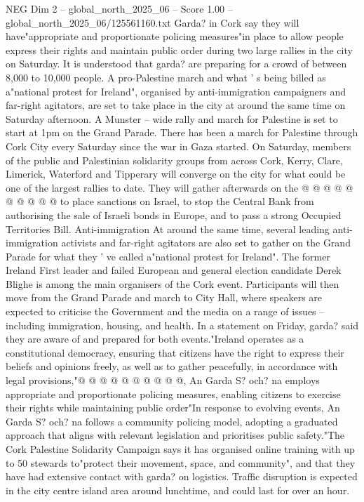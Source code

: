 \begin{textsample}{NEG Dim 2 – global\_north\_2025\_06 – Score 1.00 – global\_north\_2025\_06/125561160.txt}  \label{ex:f2_neg_092}
Garda? in Cork say they will have"appropriate and proportionate policing measures"in place to allow people express their rights and maintain public order during two large rallies in the city on Saturday.
It is understood that garda? are preparing for a crowd of between 8,000 to 10,000 people.
A pro-Palestine march and what ' s being billed as a"national protest for Ireland", organised by anti-immigration campaigners and far-right agitators, are set to take place in the city at around the same time on Saturday afternoon.
A Munster -- wide rally and march for Palestine is set to start at 1pm on the Grand Parade.
There has been a march for Palestine through Cork City every Saturday since the war in Gaza started.
On Saturday, members of the public and Palestinian solidarity groups from across Cork, Kerry, Clare, Limerick, Waterford and Tipperary will converge on the city for what could be one of the largest rallies to date.
They will gather afterwards on the @ @ @ @ @ @ @ @ @ @ to place sanctions on Israel, to stop the Central Bank from authorising the sale of Israeli bonds in Europe, and to pass a strong Occupied Territories Bill.
Anti-immigration At around the same time, several leading anti-immigration activists and far-right agitators are also set to gather on the Grand Parade for what they ' ve called a"national protest for Ireland".
The former Ireland First leader and failed European and general election candidate Derek Blighe is among the main organisers of the Cork event.
Participants will then move from the Grand Parade and march to City Hall, where speakers are expected to criticise the Government and the media on a range of issues -- including immigration, housing, and health.
In a statement on Friday, garda? said they are aware of and prepared for both events."Ireland operates as a constitutional democracy, ensuring that citizens have the right to express their beliefs and opinions freely, as well as to gather peacefully, in accordance with legal provisions,"@ @ @ @ @ @ @ @ @ @, An Garda S? och? na employs appropriate and proportionate policing measures, enabling citizens to exercise their rights while maintaining public order"In response to evolving events, An Garda S? och? na follows a community policing model, adopting a graduated approach that aligns with relevant legislation and prioritises public safety."The Cork Palestine Solidarity Campaign says it has organised online training with up to 50 stewards to"protect their movement, space, and community", and that they have had extensive contact with garda? on logistics.
Traffic disruption is expected in the city centre island area around lunchtime, and could last for over an hour.

\end{textsample}
